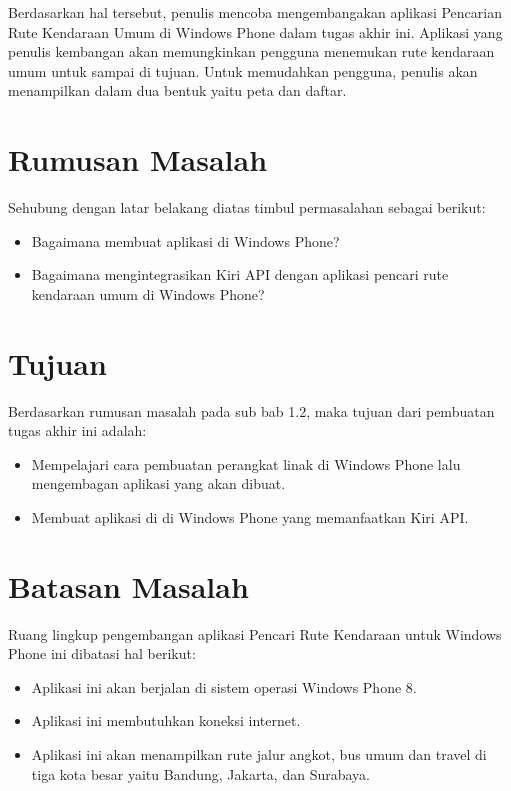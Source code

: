 Berdasarkan hal tersebut, penulis mencoba mengembangakan aplikasi Pencarian Rute Kendaraan Umum di Windows Phone dalam tugas akhir ini. Aplikasi yang penulis kembangan akan memungkinkan pengguna menemukan rute kendaraan umum untuk sampai di tujuan. Untuk memudahkan pengguna, penulis akan menampilkan dalam dua bentuk yaitu peta dan daftar. 

\section{Rumusan Masalah}
\label{sec:rumusan_masalah}
Sehubung dengan latar belakang diatas timbul permasalahan sebagai berikut:
\begin{itemize}
	\item Bagaimana membuat aplikasi di Windows Phone?
	\item Bagaimana mengintegrasikan Kiri API dengan aplikasi pencari rute kendaraan umum di Windows Phone?
\end{itemize}

\section{Tujuan}
\label{sec:tujuan}
Berdasarkan rumusan masalah pada sub bab 1.2, maka tujuan dari pembuatan tugas akhir ini adalah:
\begin{itemize}
	\item Mempelajari cara pembuatan perangkat linak di Windows Phone lalu mengembagan aplikasi yang akan dibuat.
	\item Membuat aplikasi di di Windows Phone yang memanfaatkan Kiri API.
\end{itemize}

\section{Batasan Masalah}
\label{sec:batasan_masalah}
Ruang lingkup pengembangan aplikasi Pencari Rute Kendaraan untuk Windows Phone ini dibatasi hal berikut:
\begin{itemize}
	\item Aplikasi ini akan berjalan di sistem operasi Windows Phone 8.
	\item Aplikasi ini membutuhkan koneksi internet.
	\item Aplikasi ini akan menampilkan rute jalur angkot, bus umum dan travel di tiga kota besar yaitu Bandung, Jakarta, dan Surabaya.  
\end{itemize}

